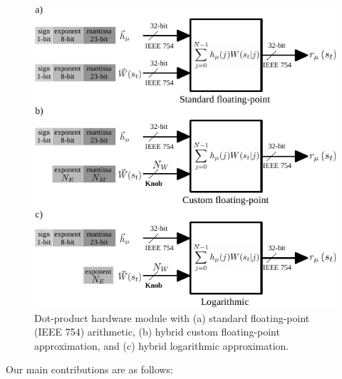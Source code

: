 \begin{figure}
	\includegraphics[width=\columnwidth]{../figures/dot-product_unit.pdf}
	\caption{Dot-product hardware module with (a) standard floating-point (IEEE 754) arithmetic, (b) hybrid custom floating-point approximation, and (c) hybrid logarithmic approximation.}
	\label{fig:dot_product_unit}
\end{figure}

Our main contributions are as follows:

